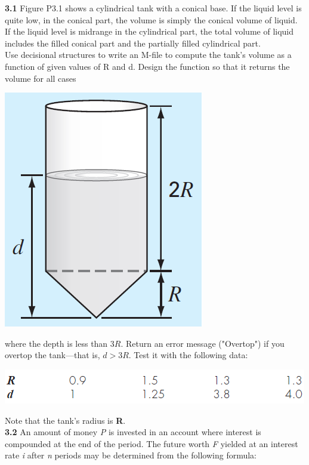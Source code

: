 \documentclass[../main.tex]{subfiles}
\begin{document}
\begin{multicols}{2}
    \noindent\textbf{3.1} Figure P3.1 shows a cylindrical tank with a conical
    base. If the liquid level is quite low, in the conical part, the
    volume is simply the conical volume of liquid. If the liquid
    level is midrange in the cylindrical part, the total volume of
    liquid includes the filled conical part and the partially filled
    cylindrical part.\\
    \indent Use decisional structures to write an M-file to compute
    the tank's volume as a function of given values of R and d.
    Design the function so that it returns the volume for all cases\\

    \noindent
    \begin{minipage}{\linewidth}
        \centering
        \includegraphics[width=0.4\linewidth]{./images/problem_3_3_1}
    \end{minipage}

    \noindent
    where the depth is less than $3R$. Return an error message
    ("Overtop") if you overtop the tank---that is, $d > 3R$. Test it
    with the following data:\\

    \noindent
    \begin{minipage}{\linewidth}
        \centering
        \includegraphics[width=0.9\linewidth]{./images/problem_3_3_2}
    \end{minipage}

    \noindent Note that the tank's radius is \textbf{R}.\\

    \noindent\textbf{3.2} An amount of money \emph{P} is invested in an account where
    interest is compounded at the end of the period. The future
    worth \emph{F} yielded at an interest rate \emph{i} after \emph{n} periods may be
    determined from the following formula:\\


\end{multicols}
\end{document}
